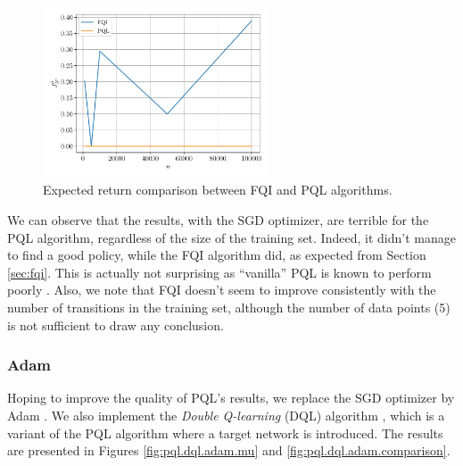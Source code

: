 \documentclass[a4paper, 12pt]{article}
\begin{document}
    \begin{figure}[h]
        \centering
        \includegraphics[width=0.6\textwidth]{resources/pdf/5_comparison_SGD.pdf}
        \caption{Expected return comparison between FQI and PQL algorithms.}
        \label{fig:fqi.pql.sgd.comparison}
    \end{figure}
    
    We can observe that the results, with the SGD optimizer, are terrible for the PQL algorithm, regardless of the size of the training set. Indeed, it didn't manage to find a good policy, while the FQI algorithm did, as expected from Section \ref{sec:fqi}. This is actually not surprising as \enquote{vanilla} PQL is known to perform poorly \cite{ernstinfo8003qfunctions}. Also, we note that FQI doesn't seem to improve consistently with the number of transitions in the training set, although the number of data points (5) is not sufficient to draw any conclusion.
    
    \subsubsection{Adam}
    
    Hoping to improve the quality of PQL's results, we replace the SGD optimizer by Adam \cite{kingma2014adam}. We also implement the \emph{Double Q-learning} (DQL) algorithm \cite{ernstinfo8003qfunctions}, which is a variant of the PQL algorithm where a target network is introduced. The results are presented in Figures \ref{fig:pql.dql.adam.mu} and \ref{fig:pql.dql.adam.comparison}.
    
\end{document}
